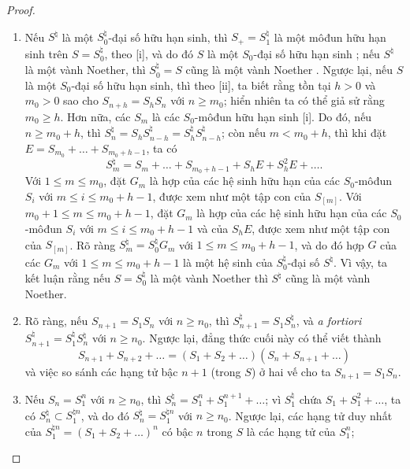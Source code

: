 \documentclass[oneside,10pt]{amsart}
\renewcommand{\leq}{\leqslant}
\renewcommand{\geq}{\geqslant}
\newcommand{\oldpage}[2][]{\marginnote{\normalfont\footnotesize\textbf{#1}~|~#2}\ignorespaces}
\begin{document}
\begin{proof}
\medskip\noindent
\begin{enumerate}
  \item[\rm{(i)}] Nếu $S^\natural$ là một $S_0^\natural$-đại số hữu hạn sinh, thì $S_+=S_1^\natural$ là một môđun hữu hạn sinh trên $S=S_0^\natural$, theo [i], và do đó $S$ là một $S_0$-đại số hữu hạn sinh ;
    nếu $S^\natural$ là một vành Noether, thì $S_0^\natural=S$ cũng là một vành Noether .
    Ngược lại, nếu $S$ là một $S_0$-đại số
\oldpage[II]{160}
    hữu hạn sinh, thì theo [ii], ta biết rằng tồn tại $h>0$ và $m_0>0$ sao cho $S_{n+h}=S_hS_n$ với $n\geq m_0$;
    hiển nhiên ta có thể giả sử rằng $m_0\geq h$.
    Hơn nữa, các $S_m$ là các $S_0$-môđun hữu hạn sinh [i].
    Do đó, nếu $n\geq m_0+h$, thì $S_n^\natural = S_hS_{n-h}^\natural = S_h^\natural S_{n-h}^\natural$;
    còn nếu $m<m_0+h$, thì khi đặt $E = S_{m_0}+\ldots+S_{m_0+h-1}$, ta có
    \[
      S_m^\natural = S_m + \ldots + S_{m_0+h-1} + S_hE + S_h^2E + \ldots.
    \]
    Với $1\leq m\leq m_0$, đặt $G_m$ là hợp của các hệ sinh hữu hạn của các $S_0$-môđun $S_i$ với $m\leq i\leq m_0+h-1$, được xem như một tập con của $S_{[m]}$.
    Với $m_0+1\leq m\leq m_0+h-1$, đặt $G_m$ là hợp của các hệ sinh hữu hạn của các $S_0$-môđun $S_i$ với $m\leq i\leq m_0+h-1$ và của $S_hE$, được xem như một tập con của $S_{[m]}$.
    Rõ ràng $S_m^\natural=S_0^\natural G_m$ với $1\leq m\leq m_0+h-1$, và do đó hợp $G$ của các $G_m$ với $1\leq m\leq m_0+h-1$ là một hệ sinh của $S_0^\natural$-đại số $S^\natural$.
    Vì vậy, ta kết luận rằng nếu $S=S_0^\natural$ là một vành Noether thì $S^\natural$ cũng là một vành Noether.
  \item[\rm{(ii)}] Rõ ràng, nếu $S_{n+1}=S_1S_n$ với $n\geq n_0$, thì $S_{n+1}^\natural=S_1S_n^\natural$, và \emph{a fortiori} $S_{n+1}^\natural=S_1^\natural S_n^\natural$ với $n\geq n_0$.
    Ngược lại, đẳng thức cuối này có thể viết thành
    \[
      S_{n+1} + S_{n+2} + \ldots
      =
      (S_1 + S_2 + \ldots)(S_n + S_{n+1} + \ldots)
    \]
    và việc so sánh các hạng tử bậc $n+1$ (trong $S$) ở hai vế cho ta $S_{n+1}=S_1S_n$.
  \item[\rm{(iii)}] Nếu $S_n=S_1^n$ với $n\geq n_0$, thì $S_n^\natural=S_1^n+S_1^{n+1}+\ldots$;
    vì $S_1^\natural$ chứa $S_1+S_1^2+\ldots$, ta có $S_n^\natural\subset S_1^{\natural n}$, và do đó $S_n^\natural=S_1^{\natural n}$ với $n\geq n_0$.
    Ngược lại, các hạng tử duy nhất của $S_1^{\natural n}=(S_1+S_2+\ldots)^n$ có bậc $n$ trong $S$ là các hạng tử của $S_1^n$;

\end{enumerate}
\end{proof}
\end{document}

